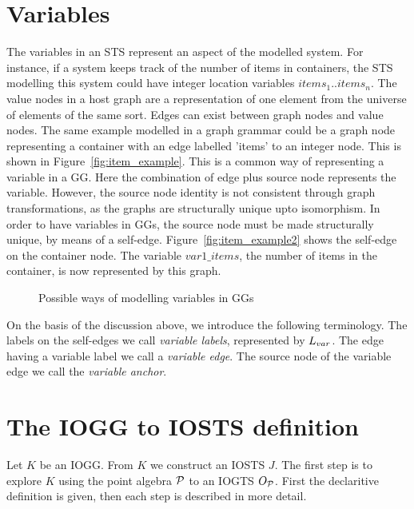 \section{Variables}
The variables in an STS represent an aspect of the modelled system. For instance, if a system keeps track of the number of items in containers, the STS modelling this system could have integer location variables $\mathit{items}_1..\mathit{items}_n$. The value nodes in a host graph are a representation of one element from the universe of elements of the same sort. Edges can exist between graph nodes and value nodes. The same example modelled in a graph grammar could be a graph node representing a container with an edge labelled 'items' to an integer node. This is shown in Figure~\ref{fig:item_example}. This is a common way of representing a variable in a GG. Here the combination of edge plus source node represents the variable. However, the source node identity is not consistent through graph transformations, as the graphs are structurally unique upto isomorphism. In order to have variables in GGs, the source node must be made structurally unique, by means of a self-edge. Figure~\ref{fig:item_example2} shows the self-edge on the container node. The variable $\mathit{var1\_items}$, the number of items in the container, is now represented by this graph.

\begin{figure}[ht]
  \begin{center}
  \end{center}
  \caption{Possible ways of modelling variables in GGs}
  \label{fig:vars-in-ggs}
\end{figure}

On the basis of the discussion above, we introduce the following terminology. The labels on the self-edges we call \textit{variable labels}, represented by $L_{var}$. The edge having a variable label we call a \textit{variable edge}. The source node of the variable edge we call the \textit{variable anchor}.

\section{The IOGG to IOSTS definition}\label{sec:algorithm}
Let $K$ be an IOGG. From $K$ we construct an IOSTS $J$. The first step is to explore $K$ using the point algebra $\mathcal{P}$ to an IOGTS $O_{\mathcal{P}}$. First the declaritive definition is given, then each step is described in more detail.

